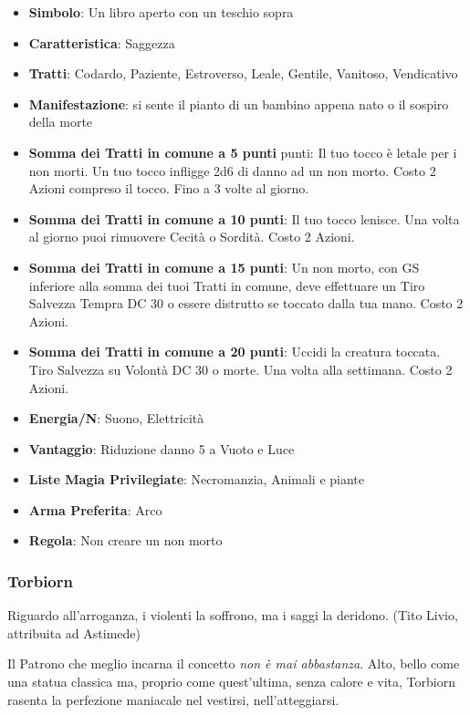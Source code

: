 \begin{multicols}{2}
\begin{itemize}[leftmargin=*] \setlength{\itemsep}{0pt}
\item \textbf{Simbolo}: Un libro aperto con un teschio sopra
\item \textbf{Caratteristica}: Saggezza
\item \textbf{Tratti}: Codardo, Paziente, Estroverso, Leale, Gentile, Vanitoso, Vendicativo
\item \textbf{Manifestazione}: si sente il pianto di un bambino appena nato o il sospiro della morte
\item \textbf{Somma dei Tratti in comune a 5 punti} punti: Il tuo tocco è letale per i non morti. Un tuo tocco infligge 2d6 di danno ad un non morto. Costo 2 Azioni compreso il tocco. Fino a 3 volte al giorno.
\item \textbf{Somma dei Tratti in comune a 10 punti}: Il tuo tocco lenisce. Una volta al giorno puoi rimuovere Cecità o Sordità. Costo 2 Azioni.
\item \textbf{Somma dei Tratti in comune a 15 punti}: Un non morto, con GS inferiore alla somma dei tuoi Tratti in comune, deve effettuare un Tiro Salvezza Tempra DC 30 o essere distrutto se toccato dalla tua mano. Costo 2 Azioni.
\item \textbf{Somma dei Tratti in comune a 20 punti}: Uccidi la creatura toccata. Tiro Salvezza su Volontà DC 30 o morte. Una volta alla settimana. Costo 2 Azioni.
\item \textbf{Energia/N}: Suono, Elettricità
\item \textbf{Vantaggio}: Riduzione danno 5 a Vuoto e Luce
\item \textbf{Liste Magia Privilegiate}: Necromanzia, Animali e piante
\item \textbf{Arma Preferita}: Arco
\item \textbf{Regola}: Non creare un non morto
\end{itemize}

\subsubsection{Torbiorn}\label{torbion}\hypertarget{torbiorn}{}

\begin{enfasi}{
Riguardo all'arroganza, i violenti la soffrono, ma i saggi la deridono. (Tito Livio, attribuita ad Astimede)
}\end{enfasi}

Il Patrono che meglio incarna il concetto \emph{non è mai abbastanza}. Alto, bello come una statua classica ma, proprio come quest'ultima, senza calore e vita, Torbiorn rasenta la perfezione maniacale nel vestirsi, nell'atteggiarsi.


\end{multicols}
